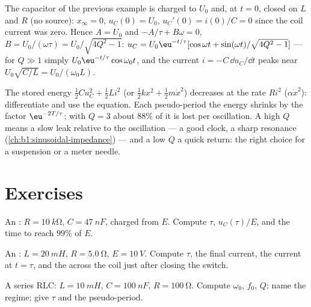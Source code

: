 \begin{example}\label{ex:b1:transient-regimes:ic}
The capacitor of the previous example is charged to $U_0$ and, at
$t = 0$, closed on $L$ and $R$ (no source): $x_\infty = 0$,
$u_C(0) = U_0$, $u_C'(0) = i(0)/C = 0$ since the coil current was zero.
Hence $A = U_0$ and $-A/\tau + B\omega = 0$, $B = U_0/(\omega\tau) =
U_0/\sqrt{4Q^2 - 1}$: $u_C = U_0\eu^{-t/\tau}[\cos\omega t + \sin(\omega
t)/\sqrt{4Q^2 - 1}]$ --- for $Q \gg 1$ simply $U_0\eu^{-t/\tau}\cos\omega_0 t$,
and the current $i = -C\,\dd u_C/\dd t$ peaks near $U_0\sqrt{C/L} =
U_0/(\omega_0 L)$.
\end{example}

\begin{remark}[Energy]\label{rem:b1:transient-regimes:energy}
The stored energy $\tfrac12 Cu_C^2 + \tfrac12 Li^2$ (or $\tfrac12 kx^2
+ \tfrac12 m\dot x^2$) decreases at the rate $Ri^2$ ($\alpha\dot x^2$):
differentiate and use the equation. Each pseudo-period the energy
shrinks by the factor $\eu^{-2T/\tau}$; with $Q = 3$ about $88\%$ of it
is lost per oscillation. A high $Q$ means a slow leak relative to the
oscillation --- a good clock, a sharp resonance
(\cref{ch:b1:sinusoidal-impedance}) --- and a low $Q$ a quick return:
the right choice for a suspension or a meter needle.
\end{remark}

\section{Exercises}

\begin{exercise}[$\star$]\label{exo:b1:transient-regimes:1}
An : $R = \qty{10}{k\ohm}$, $C = \qty{47}{nF}$, charged from
$E$. Compute $\tau$, $u_C(\tau)/E$, and the time to reach $99\%$ of $E$.
\end{exercise}

\begin{exercise}[$\star$]\label{exo:b1:transient-regimes:2}
An : $L = \qty{20}{mH}$, $R = \qty{5.0}{\ohm}$, $E = \qty{10}{V}$.
Compute $\tau$, the final current, the current at $t = \tau$, and the
 across the coil just after closing the switch.
\end{exercise}

\begin{exercise}[$\star$]\label{exo:b1:transient-regimes:3}
A series RLC: $L = \qty{10}{mH}$, $C = \qty{100}{nF}$, $R = \qty{100}{\ohm}$.
Compute $\omega_0$, $f_0$, $Q$; name the regime; give $\tau$ and the
pseudo-period.
\end{exercise}

